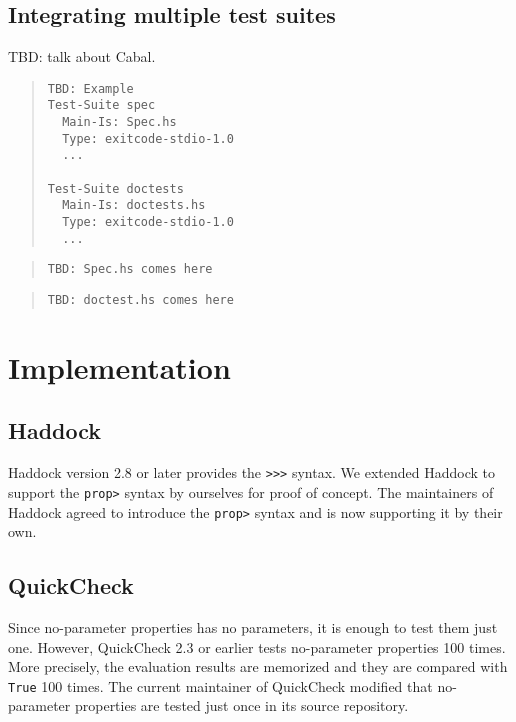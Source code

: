 \documentclass[preprint]{sigplanconf}
\begin{document}
\subsection{Integrating multiple test suites}

TBD: talk about Cabal.

\begin{quote}
\small
\begin{verbatim}
TBD: Example
Test-Suite spec
  Main-Is: Spec.hs
  Type: exitcode-stdio-1.0
  ...

Test-Suite doctests
  Main-Is: doctests.hs
  Type: exitcode-stdio-1.0
  ...
\end{verbatim}
\end{quote}

\begin{quote}
\small
\begin{verbatim}
TBD: Spec.hs comes here
\end{verbatim}
\end{quote}

\begin{quote}
\small
\begin{verbatim}
TBD: doctest.hs comes here
\end{verbatim}
\end{quote}


\section{Implementation}

\subsection{Haddock}

Haddock version 2.8 or later provides the {\tt >>>} syntax. 
We extended Haddock to support the {\tt prop>} syntax by ourselves
for proof of concept.
The maintainers of Haddock agreed to introduce 
the {\tt prop>} syntax and is now supporting it by their own.

\subsection{QuickCheck}

Since no-parameter properties has no parameters, 
it is enough to test them just one.
However, QuickCheck 2.3 or earlier tests no-parameter properties 100 times.
More precisely, the evaluation results are memorized and they are
compared with {\tt True} 100 times.
The current maintainer of QuickCheck modified that
no-parameter properties are tested just once in its source repository.
\end{document}
